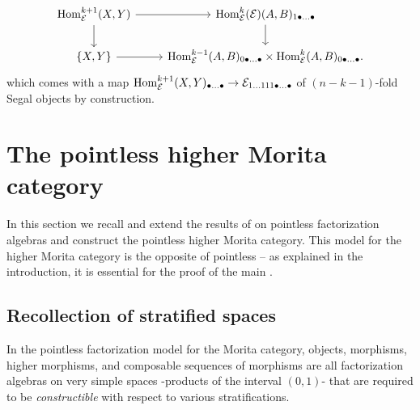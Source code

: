 \documentclass[10pt, reqno, twoside
, final
]{amsart}
\numberwithin{equation}{subsection}%
\theoremstyle{definition}
\theoremstyle{definition}
\theoremstyle{definition}
\theoremstyle{definition}
\theoremstyle{definition}
\theoremstyle{definition}
\theoremstyle{definition}
\theoremstyle{definition}
\theoremstyle{definition}
\theoremstyle{plain}
\theoremstyle{definition}
\theoremstyle{plain}
\theoremstyle{definition}
\theoremstyle{plain}
\theoremstyle{definition}
\theoremstyle{definition}
\theoremstyle{plain}
\theoremstyle{plain}
\theoremstyle{definition}
\theoremstyle{plain}
\theoremstyle{plain}
\theoremstyle{plain}
\begin{document}
\begin{enumerate}
\begin{itemize}
        \[
        \begin{tikzcd}
        \Hom^{k+1}_{\icate}(X,Y)\ar[d] \ar[r] &\Hom_{\icate}^{k}(\icate)(A,B)_{1\bullet\ldots\bullet} \ar[d] \\
        \{X,Y\} \ar[r] &  \Hom_{\icate}^{k-1}(A,B)_{0\bullet\ldots\bullet}  \times \Hom_{\icate}^{k}(A,B)_{0\bullet\ldots\bullet}. 
        \end{tikzcd}
        \]        
        which comes with a map $\mathrm{Hom}^{k+1}_{\mathcal{E}}(X,Y)_{\bullet\ldots\bullet}\rightarrow \mathcal{E}_{1\ldots 111\bullet\ldots \bullet}$ of $(n-k-1)$-fold Segal objects by construction.
    \end{itemize}
    

\end{enumerate}







\section{The pointless higher Morita category}\label{sec:Morita-cat}

In this section we recall and extend the results of \cite{KS} on pointless factorization algebras and construct the pointless higher Morita category.
This model for the higher Morita category is the opposite of pointless -- as explained in the introduction, it is essential for the proof of the main .


\subsection{Recollection of stratified spaces}

In the pointless factorization model for the Morita category, objects, morphisms, higher morphisms, and composable sequences of morphisms are all factorization algebras on very simple spaces -products of the interval $(0,1)$- that are required to be \emph{constructible} with respect to various stratifications.
\end{document}
